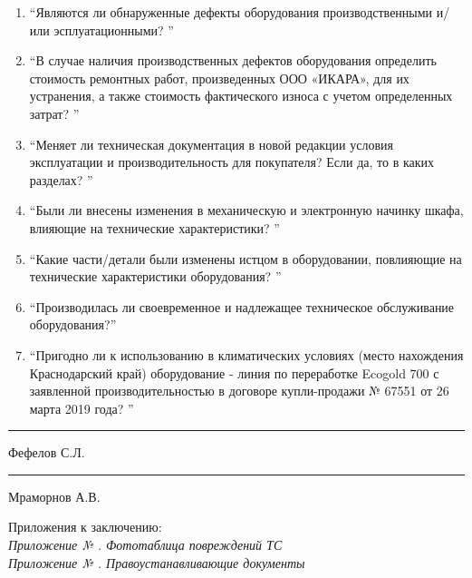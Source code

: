 \begin{enumerate}
\item \enquote{Являются ли обнаруженные дефекты оборудования производственными и/или эсплуатационными? }

\item \enquote{В случае наличия производственных дефектов оборудования определить стоимость ремонтных работ, произведенных ООО «ИКАРА», для их устранения, а также стоимость фактического износа с учетом определенных затрат? }

\item \enquote{Меняет ли техническая документация в новой редакции условия эксплуатации и производительность для покупателя? Если да, то в каких разделах? }

\item \enquote{Были ли внесены изменения в механическую и электронную начинку шкафа, влияющие на технические характеристики? }

\item \enquote{Какие части/детали были изменены истцом в оборудовании, повлияющие на технические характеристики оборудования? }

\item \enquote{Производилась ли своевременное и надлежащее техническое обслуживание оборудования?}

\item \enquote{Пригодно ли к использованию в климатических условиях (место нахождения 	Краснодарский край) оборудование - линия по переработке Ecogold 700 с заявленной производительностью в договоре купли-продажи № 67551 от 26 		марта 2019 года? }
\end{enumerate}


\vspace{10mm}
  \hfill    \rule{45mm}{0.1 mm}     {Фефелов С.Л.}\\

\vspace{1mm}

  \hfill    \rule{45mm}{0.1 mm}   {Мраморнов А.В.}\\
\vspace{7mm}
\relax



\noindent Приложения к заключению:\\

\noindent \textit{\small 
	Приложение № \Rownum. Фототаблица повреждений ТС \\
	Приложение № \Rownum. Правоустанавливающие документы\\}

